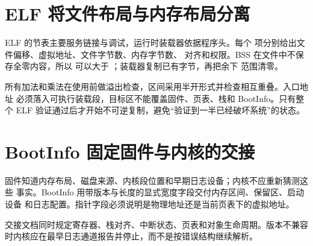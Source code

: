 \section{ELF 将文件布局与内存布局分离}

ELF 的节表主要服务链接与调试，运行时装载器依据程序头。每个
 项分别给出文件偏移、虚拟地址、文件字节数、内存字节数、
对齐和权限。BSS 在文件中不保存全零内容，所以
 可以大于 ；装载器复制已有字节，再把余下
范围清零。

所有加法和乘法在使用前做溢出检查，区间采用半开形式并检查相互重叠。入口地址
必须落入可执行装载段，目标区不能覆盖固件、页表、栈和 BootInfo。只有整个
ELF 验证通过后才开始不可逆复制，避免“验证到一半已经破坏系统”的状态。

\section{BootInfo 固定固件与内核的交接}

固件知道内存布局、磁盘来源、内核段位置和早期日志设备；内核不应重新猜测这些
事实。BootInfo 用带版本与长度的显式宽度字段交付内存区间、保留区、启动设备
和日志配置。指针字段必须说明是物理地址还是当前页表下的虚拟地址。

交接文档同时规定寄存器、栈对齐、中断状态、页表和对象生命周期。版本不兼容
时内核应在最早日志通道报告并停止，而不是按错误结构继续解析。
